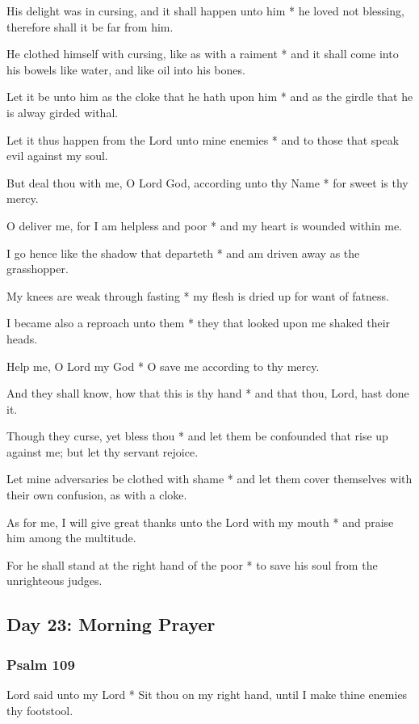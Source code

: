 His delight was in cursing, and it shall happen unto him * he loved not blessing, therefore shall it be far from him.

He clothed himself with cursing, like as with a raiment * and it shall come into his bowels like water, and like oil into his bones.

Let it be unto him as the cloke that he hath upon him * and as the girdle that he is alway girded withal.

Let it thus happen from the Lord unto mine enemies * and to those that speak evil against my soul.

But deal thou with me, O Lord God, according unto thy Name * for sweet is thy mercy.

O deliver me, for I am helpless and poor * and my heart is wounded within me.

I go hence like the shadow that departeth * and am driven away as the grasshopper.

My knees are weak through fasting * my flesh is dried up for want of fatness.

I became also a reproach unto them * they that looked upon me shaked their heads.

Help me, O Lord my God * O save me according to thy mercy.

And they shall know, how that this is thy hand * and that thou, Lord, hast done it.

Though they curse, yet bless thou * and let them be confounded that rise up against me; but let thy servant rejoice.

Let mine adversaries be clothed with shame * and let them cover themselves with their own confusion, as with a cloke.

As for me, I will give great thanks unto the Lord with my mouth * and praise him among the multitude.

For he shall stand at the right hand of the poor * to save his soul from the unrighteous judges.

\subsection{Day 23: Morning Prayer}

\subsubsection{Psalm 109}


 Lord said unto my Lord * Sit thou on my right hand, until I make thine enemies thy footstool.

